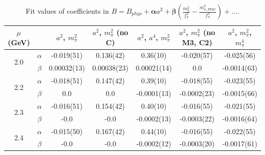 \documentclass[12pt]{extarticle}
\begin{document}
\begin{table}[h!]
\begin{center}
\begin{tabular}{|c c|c|c|c|c|c|}
\hline
$\mu$ (GeV) &  & $a^2$, $m_\pi^2$& $a^2$, $m_\pi^2$ (no C)& $a^2$, $a^4$, $m_\pi^2$& $a^2$, $m_\pi^2$ (no M3, C2)& $a^2$, $m_\pi^2$, $m_\pi^4$\\
\hline
\multirow{2}{0.5in}{2.0} & $\alpha$ & -0.019(51)& 0.136(42)& 0.36(10)& -0.020(57)& -0.025(56)\\
 & $\beta$ & 0.00032(13)& 0.00038(23)& 0.00021(14)& 0.0& -0.0014(63)\\
\hline
\multirow{2}{0.5in}{2.2} & $\alpha$ & -0.018(51)& 0.147(42)& 0.39(10)& -0.018(55)& -0.023(55)\\
 & $\beta$ & 0.0& 0.0& -0.0001(13)& -0.0002(23)& -0.0015(66)\\
\hline
\multirow{2}{0.5in}{2.3} & $\alpha$ & -0.016(51)& 0.154(42)& 0.40(10)& -0.016(55)& -0.021(55)\\
 & $\beta$ & -0.0& -0.0& -0.0002(13)& -0.0003(22)& -0.0016(64)\\
\hline
\multirow{2}{0.5in}{2.4} & $\alpha$ & -0.015(50)& 0.167(42)& 0.44(10)& -0.016(55)& -0.022(55)\\
 & $\beta$ & -0.0& -0.0& -0.0002(12)& -0.0003(20)& -0.0017(61)\\
\hline
\end{tabular}
\caption{Fit values of coefficients in $B = B_{phys} + \mathbf{\alpha} a^2 + \mathbf{\beta}\left(\frac{m_\pi^2}{f_\pi^2}-\frac{m_{\pi,PDG}^2}{f_\pi^2}\right) + \ldots$.}
\end{center}
\end{table}




















\clearpage
\end{document}

